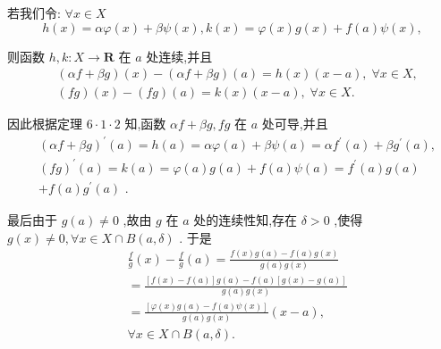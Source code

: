 若我们令: $\forall x \in  X$
$$h\left( x\right)  = {\alpha \varphi }\left( x\right)  + {\beta \psi }\left( x\right) ,k\left( x\right)  = \varphi \left( x\right) g\left( x\right)  + f\left( a\right) \psi \left( x\right) ,$$

则函数 $h,k : X \rightarrow  \mathbf{R}$ 在 $a$ 处连续,并且
\begin{align*}
	&\left( {{\alpha f} + {\beta g}}\right) \left( x\right)  - \left( {{\alpha f} + {\beta g}}\right) \left( a\right)  = h\left( x\right) \left( {x - a}\right) ,\;\forall x \in  X,\\
	&\left( {fg}\right) \left( x\right)  - \left( {fg}\right) \left( a\right)  = k\left( x\right) \left( {x - a}\right) ,\;\forall x \in  X.
\end{align*}

因此根据定理 $6 \cdot  1 \cdot  2$ 知,函数 ${\alpha f} + {\beta g},{fg}$ 在 $a$ 处可导,并且
\begin{align*}
	&{\left( \alpha f + \beta g\right) }^{\prime }\left( a\right)  = h\left( a\right)  = {\alpha \varphi }\left( a\right)  + {\beta \psi }\left( a\right)  = \alpha {f}^{\prime }\left( a\right)  + \beta {g}^{\prime }\left( a\right) ,\\
	&{\left( fg\right) }^{\prime }\left( a\right)  = k\left( a\right)  = \varphi \left( a\right) g\left( a\right)  + f\left( a\right) \psi \left( a\right)  = {f}^{\prime }\left( a\right) g\left( a\right)\\
	&+ f\left( a\right) {g}^{\prime }\left( a\right) \text{ . }
\end{align*}

最后由于 $g\left( a\right)  \neq  0$ ,故由 $g$ 在 $a$ 处的连续性知,存在 $\delta  > 0$ ,使得 $g\left( x\right)  \neq  0,\forall x \in  X \cap  B\left( {a,\delta }\right)$ . 于是
\begin{align*}
	&\frac{f}{g}\left( x\right)  - \frac{f}{g}\left( a\right)  = \frac{f\left( x\right) g\left( a\right)  - f\left( a\right) g\left( x\right) }{g\left( a\right) g\left( x\right) }\\
	&= \frac{\left\lbrack  {f\left( x\right)  - f\left( a\right) }\right\rbrack  g\left( a\right)  - f\left( a\right) \left\lbrack  {g\left( x\right)  - g\left( a\right) }\right\rbrack  }{g\left( a\right) g\left( x\right) }\\
	&= \frac{\left\lbrack  \varphi \left( x\right) g\left( a\right)  - f\left( a\right) \psi \left( x\right) \right\rbrack  }{g\left( a\right) g\left( x\right) }\left( {x - a}\right) ,\\
	&\forall x \in  X \cap  B\left( {a,\delta }\right) .
\end{align*}

